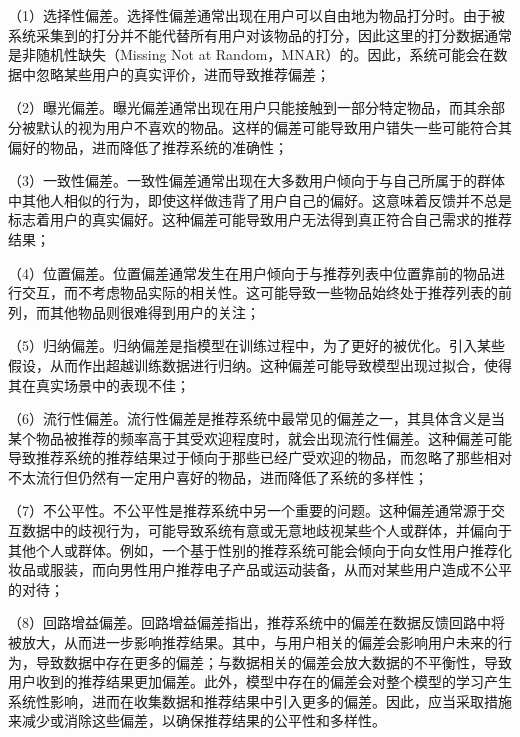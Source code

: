 （1）选择性偏差。选择性偏差通常出现在用户可以自由地为物品打分时。由于被系统采集到的打分并不能代替所有用户对该物品的打分，因此这里的打分数据通常是非随机性缺失（Missing Not at Random，MNAR）的。因此，系统可能会在数据中忽略某些用户的真实评价，进而导致推荐偏差；

（2）曝光偏差。曝光偏差通常出现在用户只能接触到一部分特定物品，而其余部分被默认的视为用户不喜欢的物品。这样的偏差可能导致用户错失一些可能符合其偏好的物品，进而降低了推荐系统的准确性；

（3）一致性偏差。一致性偏差通常出现在大多数用户倾向于与自己所属于的群体中其他人相似的行为，即使这样做违背了用户自己的偏好。这意味着反馈并不总是标志着用户的真实偏好。这种偏差可能导致用户无法得到真正符合自己需求的推荐结果；

（4）位置偏差。位置偏差通常发生在用户倾向于与推荐列表中位置靠前的物品进行交互，而不考虑物品实际的相关性。这可能导致一些物品始终处于推荐列表的前列，而其他物品则很难得到用户的关注；

（5）归纳偏差。归纳偏差是指模型在训练过程中，为了更好的被优化。引入某些假设，从而作出超越训练数据进行归纳。这种偏差可能导致模型出现过拟合，使得其在真实场景中的表现不佳；

（6）流行性偏差。流行性偏差是推荐系统中最常见的偏差之一，其具体含义是当某个物品被推荐的频率高于其受欢迎程度时，就会出现流行性偏差。这种偏差可能导致推荐系统的推荐结果过于倾向于那些已经广受欢迎的物品，而忽略了那些相对不太流行但仍然有一定用户喜好的物品，进而降低了系统的多样性；

（7）不公平性。不公平性是推荐系统中另一个重要的问题。这种偏差通常源于交互数据中的歧视行为，可能导致系统有意或无意地歧视某些个人或群体，并偏向于其他个人或群体。例如，一个基于性别的推荐系统可能会倾向于向女性用户推荐化妆品或服装，而向男性用户推荐电子产品或运动装备，从而对某些用户造成不公平的对待；

（8）回路增益偏差。回路增益偏差指出，推荐系统中的偏差在数据反馈回路中将被放大，从而进一步影响推荐结果。其中，与用户相关的偏差会影响用户未来的行为，导致数据中存在更多的偏差；与数据相关的偏差会放大数据的不平衡性，导致用户收到的推荐结果更加偏差。此外，模型中存在的偏差会对整个模型的学习产生系统性影响，进而在收集数据和推荐结果中引入更多的偏差。因此，应当采取措施来减少或消除这些偏差，以确保推荐结果的公平性和多样性。

